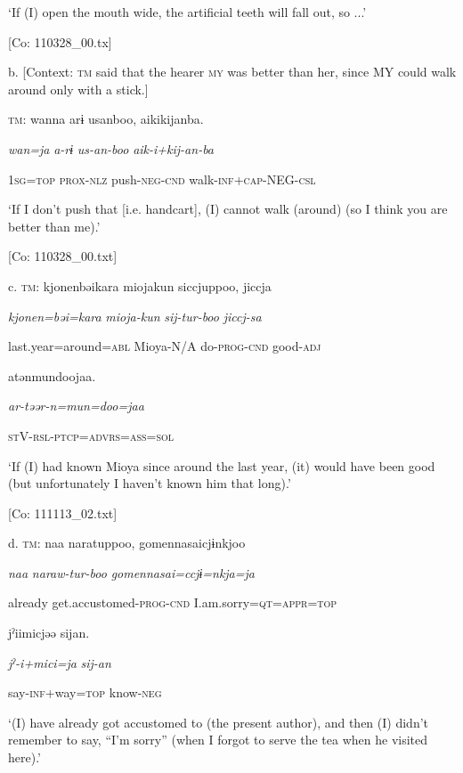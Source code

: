       ‘If (I) open the mouth wide, the artificial teeth will fall out, so ...’

      [Co: 110328\_00.tx]

  b.  [Context: \textsc{tm} said that the hearer \textsc{my} was better than her, since MY could walk around only with a stick.]

    \textsc{tm}:  wanna  arɨ  usanboo,  aikikijanba.

      \textit{wan=ja}  \textit{a-rɨ}  \textit{us-an-boo}  \textit{aik-i+kij-an-ba}

      1\textsc{sg}=\textsc{top}  \textsc{prox}-\textsc{nlz}  push-\textsc{neg}-\textsc{cnd}  walk-\textsc{inf}+\textsc{cap}-NEG-\textsc{csl}

      ‘If I don’t push that [i.e. handcart], (I) cannot walk (around) (so I think you are better than me).’

      [Co: 110328\_00.txt]

  c.  \textsc{tm}:  {\textbar}kjonen{\textbar}bəikara  mioja{\textbar}kun{\textbar}  siccjuppoo,  jiccja

      \textit{kjonen=bəi=kara}  \textit{mioja-kun}  \textit{sij-tur-boo}  \textit{jiccj-sa}

      last.year=around=\textsc{abl}  Mioya-N/A  do-\textsc{prog}-\textsc{cnd}  good-\textsc{adj}

      atənmundoojaa.

      \textit{ar-təər-n=mun=doo=jaa}

      \textsc{st}V-\textsc{rsl}-\textsc{ptcp}=\textsc{advrs}=\textsc{ass}=\textsc{sol}

      ‘If (I) had known Mioya since around the last year, (it) would have been good (but unfortunately I haven’t known him that long).’

      [Co: 111113\_02.txt]

  d.  \textsc{tm}:  naa  naratuppoo,  {\textbar}gomennasai{\textbar}cjɨnkjoo

      \textit{naa}  \textit{naraw-tur-boo}  \textit{gomennasai=ccjɨ=nkja=ja}

      already  get.accustomed-\textsc{prog}-\textsc{cnd}  I.am.sorry=\textsc{qt}=\textsc{appr}=\textsc{top}

      jˀiimicjəə  sijan.

      \textit{jˀ-i+mici=ja}  \textit{sij-an}

      say-\textsc{inf}+way=\textsc{top}  know-\textsc{neg}

      ‘(I) have already got accustomed to (the present author), and then (I) didn’t remember to say, “I’m sorry” (when I forgot to serve the tea when he visited here).’

